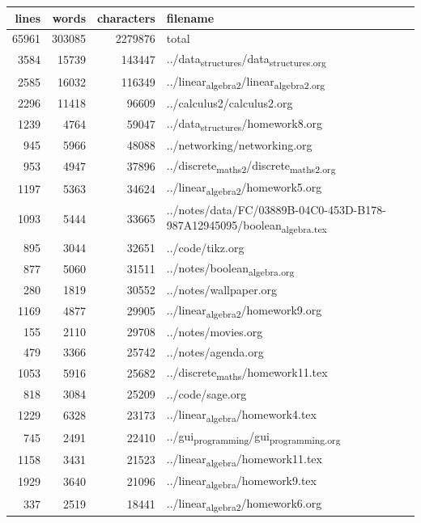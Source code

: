 \documentclass[a4paper,12pt]{article}
\newcommand{\?}{\stackrel{?}{=}}
\begin{document}
\begin{center}
\begin{tabular}{rrrl}
lines & words & characters & filename\\[0pt]
\hline
65961 & 303085 & 2279876 & total\\[0pt]
3584 & 15739 & 143447 & ../data\textsubscript{structures}/data\textsubscript{structures.org}\\[0pt]
2585 & 16032 & 116349 & ../linear\textsubscript{algebra2}/linear\textsubscript{algebra2.org}\\[0pt]
2296 & 11418 & 96609 & ../calculus2/calculus2.org\\[0pt]
1239 & 4764 & 59047 & ../data\textsubscript{structures}/homework8.org\\[0pt]
945 & 5966 & 48088 & ../networking/networking.org\\[0pt]
953 & 4947 & 37896 & ../discrete\textsubscript{maths2}/discrete\textsubscript{maths2.org}\\[0pt]
1197 & 5363 & 34624 & ../linear\textsubscript{algebra2}/homework5.org\\[0pt]
1093 & 5444 & 33665 & ../notes/data/FC/03889B-04C0-453D-B178-987A12945095/boolean\textsubscript{algebra.tex}\\[0pt]
895 & 3044 & 32651 & ../code/tikz.org\\[0pt]
877 & 5060 & 31511 & ../notes/boolean\textsubscript{algebra.org}\\[0pt]
280 & 1819 & 30552 & ../notes/wallpaper.org\\[0pt]
1169 & 4877 & 29905 & ../linear\textsubscript{algebra2}/homework9.org\\[0pt]
155 & 2110 & 29708 & ../notes/movies.org\\[0pt]
479 & 3366 & 25742 & ../notes/agenda.org\\[0pt]
1053 & 5916 & 25682 & ../discrete\textsubscript{maths}/homework11.tex\\[0pt]
818 & 3084 & 25209 & ../code/sage.org\\[0pt]
1229 & 6328 & 23173 & ../linear\textsubscript{algebra}/homework4.tex\\[0pt]
745 & 2491 & 22410 & ../gui\textsubscript{programming}/gui\textsubscript{programming.org}\\[0pt]
1158 & 3431 & 21523 & ../linear\textsubscript{algebra}/homework11.tex\\[0pt]
1929 & 3640 & 21096 & ../linear\textsubscript{algebra}/homework9.tex\\[0pt]
337 & 2519 & 18441 & ../linear\textsubscript{algebra2}/homework6.org\\[0pt]

\end{tabular}
\end{center}
\end{document}
